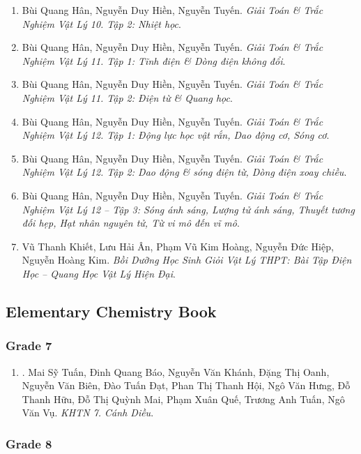 \documentclass{article}
\begin{document}
\begin{enumerate}
	\item Bùi Quang Hân, Nguyễn Duy Hiền, Nguyễn Tuyến. {\it Giải Toán \& Trắc Nghiệm Vật Lý 10. Tập 2: Nhiệt học}.
	\item Bùi Quang Hân, Nguyễn Duy Hiền, Nguyễn Tuyến. {\it Giải Toán \& Trắc Nghiệm Vật Lý 11. Tập 1: Tĩnh điện \& Dòng điện không đổi}.
	\item Bùi Quang Hân, Nguyễn Duy Hiền, Nguyễn Tuyến. {\it Giải Toán \& Trắc Nghiệm Vật Lý 11. Tập 2: Điện từ \& Quang học}.
	\item Bùi Quang Hân, Nguyễn Duy Hiền, Nguyễn Tuyến. {\it Giải Toán \& Trắc Nghiệm Vật Lý 12. Tập 1: Động lực học vật rắn, Dao động cơ, Sóng cơ}.
	\item Bùi Quang Hân, Nguyễn Duy Hiền, Nguyễn Tuyến. {\it Giải Toán \& Trắc Nghiệm Vật Lý 12. Tập 2: Dao động \& sóng điện từ, Dòng điện xoay chiều}.
	\item Bùi Quang Hân, Nguyễn Duy Hiền, Nguyễn Tuyến. {\it Giải Toán \& Trắc Nghiệm Vật Lý 12 -- Tập 3: Sóng ánh sáng, Lượng tử ánh sáng, Thuyết tương đối hẹp, Hạt nhân nguyên tử, Từ vi mô đến vĩ mô}.
	\item Vũ Thanh Khiết, Lưu Hải Ân, Phạm Vũ Kim Hoàng, Nguyễn Đức Hiệp, Nguyễn Hoàng Kim. {\it Bồi Dưỡng Học Sinh Giỏi Vật Lý THPT: Bài Tập Điện Học -- Quang Học Vật Lý Hiện Đại}.
\end{enumerate}

\subsection{Elementary Chemistry Book}

\subsubsection{Grade 7}

\begin{enumerate}
	\item \cite{SGK_KHTN_7_Canh_Dieu}. Mai Sỹ Tuấn, Đinh Quang Báo, Nguyễn Văn Khánh, Đặng Thị Oanh, Nguyễn Văn Biên, Đào Tuấn Đạt, Phan Thị Thanh Hội, Ngô Văn Hưng, Đỗ Thanh Hữu, Đỗ Thị Quỳnh Mai, Phạm Xuân Quế, Trương Anh Tuấn, Ngô Văn Vụ. {\it KHTN 7. Cánh Diều}.\hfill{\sf[reading]}
\end{enumerate}

\subsubsection{Grade 8}
\end{document}

